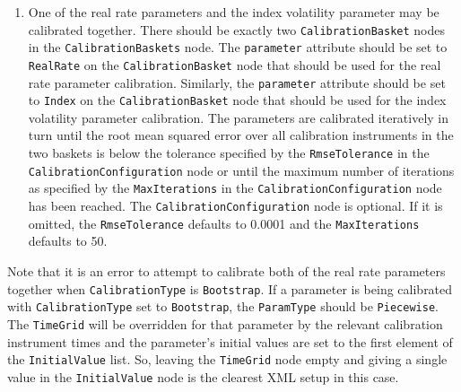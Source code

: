 \documentclass[12pt, a4paper]{article}
\begin{document}
{\begin{enumerate}
\item
One of the real rate parameters and the index volatility parameter may be calibrated together. There should be exactly two \lstinline!CalibrationBasket! nodes in the \lstinline!CalibrationBaskets! 
node. The \lstinline!parameter! attribute should be set to \lstinline!RealRate! on the \lstinline!CalibrationBasket! node that should be used for the real rate parameter calibration. 
Similarly, the \lstinline!parameter! attribute should be set to \lstinline!Index! on the \lstinline!CalibrationBasket! node that should be used for the index volatility parameter calibration. 
The parameters are calibrated iteratively in turn until the root mean squared error over all calibration instruments in the two baskets is below the tolerance specified by the 
\lstinline!RmseTolerance! in the \lstinline!CalibrationConfiguration! node or until the maximum number of iterations as specified by the \lstinline!MaxIterations! in the 
\lstinline!CalibrationConfiguration! node has been reached. The \lstinline!CalibrationConfiguration! node is optional. If it is omitted, the \lstinline!RmseTolerance! defaults to 0.0001 and the 
\lstinline!MaxIterations! defaults to 50.

\end{enumerate}

Note that it is an error to attempt to calibrate both of the real rate parameters together when \lstinline!CalibrationType! is \lstinline!Bootstrap!. If a parameter is being calibrated 
with \lstinline!CalibrationType! set to \lstinline!Bootstrap!, the \lstinline!ParamType! should be \lstinline!Piecewise!. The \lstinline!TimeGrid! will be overridden for that parameter by 
the relevant calibration instrument times and the parameter's initial values are set to the first element of the \lstinline!InitialValue! list. So, leaving the \lstinline!TimeGrid! node 
empty and giving a single value in the \lstinline!InitialValue! node is the clearest XML setup in this case.

}
\end{document}
